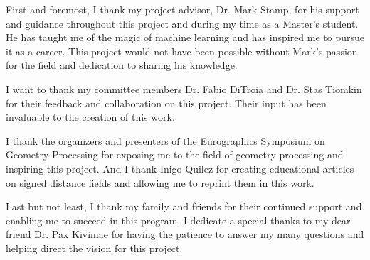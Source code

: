 First and foremost, I thank my project advisor, Dr. Mark Stamp, for his support and guidance throughout this project and during my time as a Master's student. He has taught me of the magic of machine learning and has inspired me to pursue it as a career. This project would not have been possible without Mark's passion for the field and dedication to sharing his knowledge.

I want to thank my committee members Dr. Fabio DiTroia and Dr. Stas Tiomkin for their feedback and collaboration on this project. Their input has been invaluable to the creation of this work.

I thank the organizers and presenters of the Eurographics Symposium on Geometry Processing for exposing me to the field of geometry processing and inspiring this project. And I thank Inigo Quilez for creating educational articles on signed distance fields and allowing me to reprint them in this work.

Last but not least, I thank my family and friends for their continued support and enabling me to succeed in this program. I dedicate a special thanks to my dear friend Dr. Pax Kivimae for having the patience to answer my many questions and helping direct the vision for this project.